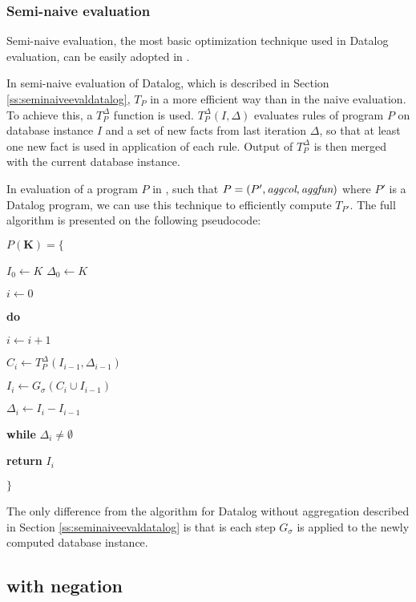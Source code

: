 \subsubsection{Semi-naive evaluation} Semi-naive evaluation, the most basic optimization technique used in Datalog evaluation, can be easily adopted in \datalogra.

In semi-naive evaluation of Datalog, which is described in Section \ref{ss:seminaiveevaldatalog}, $T_P$ in a more efficient way than in the naive evaluation. To achieve this, a $T^\Delta_P$ function is used. $T_P^\Delta(I, \Delta)$ evaluates rules of program $P$ on database instance $I$ and a set of new facts from last iteration $\Delta$, so that at least one new fact is used in application of each rule. Output of $T^\Delta_P$ is then merged with the current database instance.

In evaluation of a program $P$ in \datalogra, such that $P = (P', \textit{aggcol}, \textit{aggfun})$ where $P'$ is a Datalog program, we can use this technique to efficiently compute $T_{P'}$. The full algorithm is presented on the following pseudocode:


\parbox{0.5\textwidth}{
$P(\textbf{K}) = \{$

{\addtolength{\leftskip}{5mm}

$I_0 \leftarrow K$
$\Delta_0 \leftarrow K$

$i \leftarrow 0$

\textbf{do}

{\addtolength{\leftskip}{5mm}

$i \leftarrow i + 1$

$C_i \leftarrow T_P^\Delta(I_{i-1}, \Delta_{i-1})$

$I_i \leftarrow G_\sigma(C_i \cup I_{i-1})$

$\Delta_i \leftarrow I_i - I_{i-1}$

}

\textbf{while} $\Delta_i \ne \emptyset$

\textbf{return} $I_i$

}

$\}$
}

The only difference from the algorithm for Datalog without aggregation described in Section \ref{ss:seminaiveevaldatalog} is that is each step $G_\sigma$ is applied to the newly computed database instance.

\subsection{\datalogra with negation}


